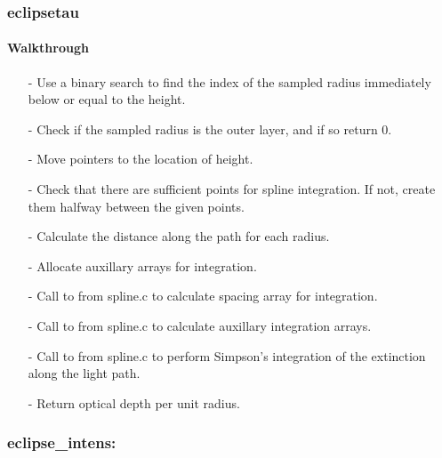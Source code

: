 \documentclass[letterpaper,12pt]{article}
\begin{document}
\newline

\newline

\newline

\subsubsection{eclipsetau}
\noindent
\paragraph{Walkthrough}
\begin{enumerate}[leftmargin=10pt, noitemsep, parsep=0pt, topsep=0ex]
\item[-] Use a binary search to find the index of the sampled radius immediately below or equal to the height.
\item[-] Check if the sampled radius is the outer layer, and if so return 0.
\item[-] Move pointers to the location of height.
\item[-] Check that there are sufficient points for spline integration. If not, create them halfway between the given points.
\item[-] Calculate the distance along the path for each radius.
\item[-] Allocate auxillary arrays for integration.
\item[-] Call to  from spline.c to calculate spacing array for integration.
\item[-] Call to  from spline.c to calculate auxillary integration arrays.
\item[-] Call to  from spline.c to perform Simpson's integration of the extinction along the light path.
\item[-] Return optical depth per unit radius.
\end{enumerate}

\subsubsection{eclipse\_intens:}
\end{document}
